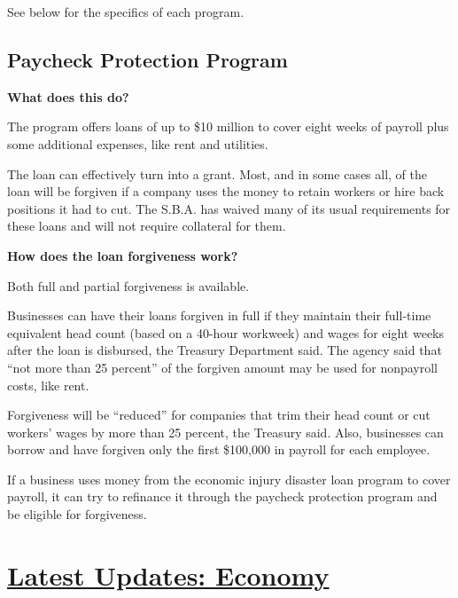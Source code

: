 See below for the specifics of each program.

\hypertarget{paycheck-protection-program}{%
\subsection{Paycheck Protection
Program}\label{paycheck-protection-program}}

\textbf{What does this do?}

The program offers loans of up to \$10 million to cover eight weeks of
payroll plus some additional expenses, like rent and utilities.

The loan can effectively turn into a grant. Most, and in some cases all,
of the loan will be forgiven if a company uses the money to retain
workers or hire back positions it had to cut. The S.B.A. has waived many
of its usual requirements for these loans and will not require
collateral for them.

\textbf{How does the loan forgiveness work?}

Both full and partial forgiveness is available.

Businesses can have their loans forgiven in full if they maintain their
full-time equivalent head count (based on a 40-hour workweek) and wages
for eight weeks after the loan is disbursed, the Treasury Department
said. The agency said that ``not more than 25 percent'' of the forgiven
amount may be used for nonpayroll costs, like rent.

Forgiveness will be ``reduced'' for companies that trim their head count
or cut workers' wages by more than 25 percent, the Treasury said. Also,
businesses can borrow and have forgiven only the first \$100,000 in
payroll for each employee.

If a business uses money from the economic injury disaster loan program
to cover payroll, it can try to refinance it through the paycheck
protection program and be eligible for forgiveness.

\hypertarget{latest-updates-economy}{%
\section{\texorpdfstring{\href{https://www.nytimes3xbfgragh.onion/live/2020/08/04/business/stock-market-today-coronavirus?action=click\&pgtype=Article\&state=default\&region=MAIN_CONTENT_1\&context=storylines_live_updates}{Latest
Updates:
Economy}}{Latest Updates: Economy}}\label{latest-updates-economy}}

